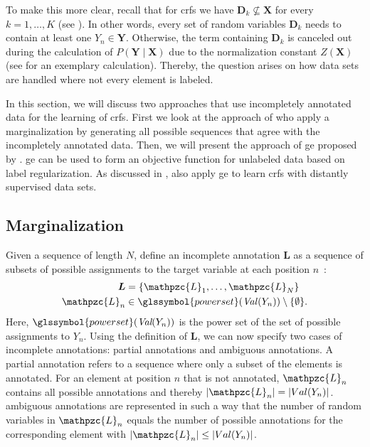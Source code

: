 To make this more clear, recall that for \glspl{crf} we have $\mathbf{D}_k\not\subseteq\mathbf{X}$ for every $k=1,\dots,K$ (see ).
In other words, every set of \glspl{random variable} $\mathbf{D}_k$ needs to contain at least one $Y_n\in\mathbf{Y}$.
Otherwise, the term containing $\mathbf{D}_k$ is canceled out during the calculation of $P(\mathbf{Y}\mid\mathbf{X})$ due to the normalization constant $Z(\mathbf{X})$ (see  for an exemplary calculation).
Thereby, the question arises on how data sets are handled where not every element is labeled.

In this section, we will discuss two approaches that use incompletely annotated data for the learning of \glspl{crf}.
First we look at the approach of \citet{tsuboi2008training} who apply a marginalization by generating all possible sequences that agree with the incompletely annotated data.
Then, we will present the approach of \acrfull{ge} proposed by \citet{mann2007simple}.
\Gls{ge} can be used to form an \gls{objective function} for unlabeled data based on \gls{label regularization}.
As discussed in , \citet{lu2013web} also apply \gls{ge} to learn \glspl{crf} with distantly supervised data sets.

\subsection{Marginalization}\label{subsec:marginalization}

Given a sequence of length $N$, \citet{tsuboi2008training} define an incomplete annotation $\bm{L}$ as a sequence of subsets of possible assignments to the \gls{target variable} at each position $n$~\citep{tsuboi2008training}:
\begin{equation}
  \label{equ:incomplete-annotation}
  \begin{split}
    \bm{L}&= \left\{\mathpzc{L}_1,\dots,\mathpzc{L}_N\right\}\\
    \mathpzc{L}_n&\in\glssymbol{power set}(\mathit{Val}(Y_n))\setminus \{\emptyset\}.
  \end{split}
\end{equation}
Here, $\glssymbol{power set}(\textit{Val}(Y_n))$ is the \gls{power set} of the set of possible \glspl{assignment} to $Y_n$.
Using the definition of $\bm{L}$, we can now specify two cases of incomplete annotations: \Glspl{partial annotation} and \glspl{ambiguous annotation}.
A \gls{partial annotation} refers to a sequence where only a subset of the elements is annotated.
For an element at position $n$ that is not annotated, $\mathpzc{L}_n$ contains all possible annotations and thereby $|\mathpzc{L}_n|=|Val(Y_n)|$.
\Glspl{ambiguous annotation} are represented in such a way that the number of \glspl{random variable} in $\mathpzc{L}_n$ equals the number of possible annotations for the corresponding element with $|\mathpzc{L}_n|\leq |Val(Y_n)|$.

